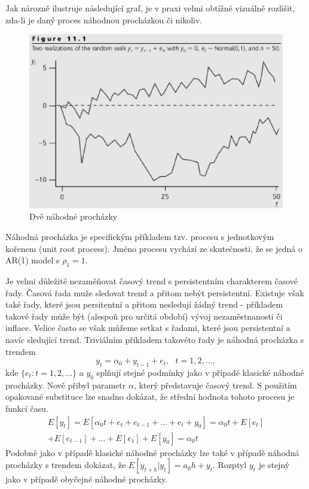 Jak nározně ilustruje následující graf, je v praxi velmi obtížné vizuálně rozlišit, zda-li je daný proces náhodnou procházkou či nikoliv.
\begin{figure}[htp]
\centering
\includegraphics[scale = 0.5]{pictures/figure_11_1.eps}
\caption{Dvě náhodné procházky}
\label{figure_11_1}
\end{figure}
Náhodná procházka je specifickým příkladem tzv. procesu s jednotkovým kořenem (unit root process). Jméno procesu vychází ze skutečnosti, že se jedná o AR(1) model s $\rho_1 = 1$.

Je velmi důležité nezaměňovat časový trend s persistentním charakterem časové řady. Časová řada muže sledovat trend a přitom nebýt persistentní. Existuje však také řady, které jsou persitentní a přitom nesledují žádný trend - příkladem takové řady může být (alespoň pro určitá období) vývoj nezaměstnanosti či inflace. Velice často se však můžeme setkat s řadami, které jsou persistentní a navíc sledující trend. Triviálním příkladem takovéto řady je náhodná procházka s trendem
\begin{equation}
y_t = \alpha_0  + y_{t - 1} + e_t, ~~~ t = 1, 2, ...,
\end{equation}
kde $\{e_t: t = 1, 2, ...\}$ a $y_0$ splňují stejné podmínky jako v případě klasické náhodné procházky. Nově přibyl parametr $\alpha$, který představuje časový trend. S použitím opakované substituce lze snadno dokázat, že střední hodnota tohoto procesu je funkcí času.
\begin{multline}
  E[y_t] = E[\alpha_0t + e_t + e_{t - 1} + ... + e_t + y_0] = \alpha_0 t + E[e_t]\\
  + E[e_{t - 1}] + ... + E[e_1] + E[y_0] = \alpha_0 t
\end{multline}
Podobně jako v případě klasické náhodné procházky lze také v případě náhodná procházky s trendem dokázat, že $E[y_{t + h}|y_t] = a_0 h + y_t$. Rozptyl $y_t$ je stejný jako v případě obyčejné náhodné procházky.

